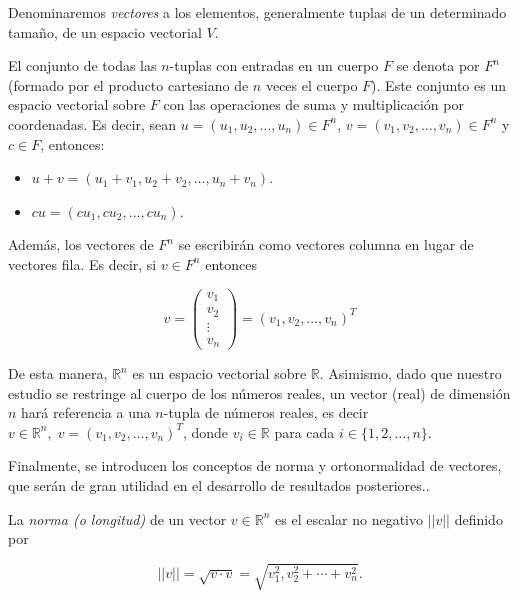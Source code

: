 Denominaremos \emph{vectores} a los elementos, generalmente tuplas de un determinado tamaño, de un espacio vectorial $V$.\newline

\begin{observacion}
    El conjunto de todas las $n$-tuplas con entradas en un cuerpo $F$ se denota por $F^{n}$ (formado por el producto cartesiano de $n$ veces el cuerpo $F$). Este conjunto es un espacio vectorial sobre $F$ con las operaciones de suma y multiplicación por coordenadas. Es decir, sean $u = (u_{1}, u_{2}, \ldots, u_{n}) \in F^{n}$, $v = (v_{1}, v_{2}, \ldots, v_{n}) \in F^{n}$ y $c \in F$, entonces:
    \begin{itemize}
        \item $u + v = (u_{1}+v_{1}, u_{2}+v_{2},\ldots, u_{n}+v_{n})$.
        \item $cu = (cu_{1}, cu_{2}, \ldots, cu_{n})$.
    \end{itemize}

    Además, los vectores de $F^{n}$ se escribirán como vectores columna en lugar de vectores fila. Es decir, si $v \in F^{n}$ entonces

    \[ 
        v = \begin{pmatrix} 
            v_{1} \\ 
            v_{2} \\ 
            \vdots \\
            v_{n}
        \end{pmatrix} = {(v_{1}, v_{2}, \ldots, v_{n})}^{T} 
    \]
        
\end{observacion}

De esta manera, $\mathbb{R}^{n}$ es un espacio vectorial sobre $\mathbb{R}$. Asimismo, dado que nuestro estudio se restringe al cuerpo de los números reales, un vector (real) de dimensión $n$ hará referencia a una $n$-tupla de números reales, es decir $v \in \mathbb{R}^{n}, \; v = {(v_{1}, v_{2}, \ldots, v_{n})}^{T}$, donde $v_{i} \in \mathbb{R}$ para cada $i \in \{1,2, \ldots, n\}$.\newline


Finalmente, se introducen los conceptos de norma y ortonormalidad de vectores, que serán de gran utilidad en el desarrollo de resultados posteriores..

\begin{definicion}
    La \emph{norma (o longitud)} de un vector $v \in \mathbb{R}^{n}$ es el escalar no negativo $||v||$ definido por 

    \[ ||v|| = \sqrt{v \cdot v} = \sqrt{v_{1}^{2}, v_{2}^{2} + \cdots + v_{n}^{2}}. \]\newline
\end{definicion}

